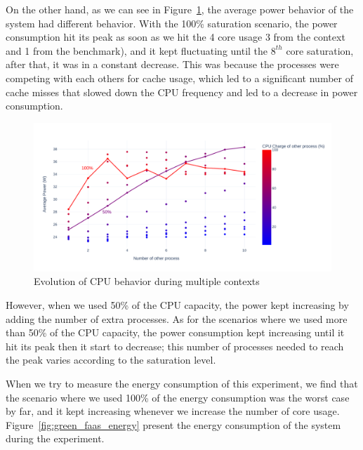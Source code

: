 On the other hand, as we can see in Figure~\ref{fig:green_faas_power}, the average power behavior of the system had different behavior.
With the 100\% saturation scenario, the power consumption hit its peak as soon as we hit the 4 core usage 3 from the context and 1 from the benchmark), and it kept fluctuating until the $8^{th}$ core saturation, after that, it was in a constant decrease.
This was because the processes were competing with each others for cache usage, which led to a significant number of cache misses that slowed down the CPU frequency and led to a decrease in power consumption.

\begin{figure}[!h]
      \centering
      \includegraphics[width=\linewidth]{chapters/green_faas_power}
      \caption{Evolution of CPU behavior during multiple contexts }
      \label{fig:green_faas_power}
\end{figure}


However, when we used 50\% of the CPU capacity, the power kept increasing by adding the number of extra processes.
As for the scenarios where we used more than 50\% of the CPU capacity, the power consumption kept increasing until it hit its peak then it start to decrease; this number of processes needed to reach the peak varies according to the saturation level.

When we try to measure the energy consumption of this experiment, we find that the scenario where we used 100\% of the energy consumption was the worst case by far, and it kept increasing whenever we increase the number of core usage.
Figure~\ref{fig:green_faas_energy} present the energy consumption of the system during the experiment.

